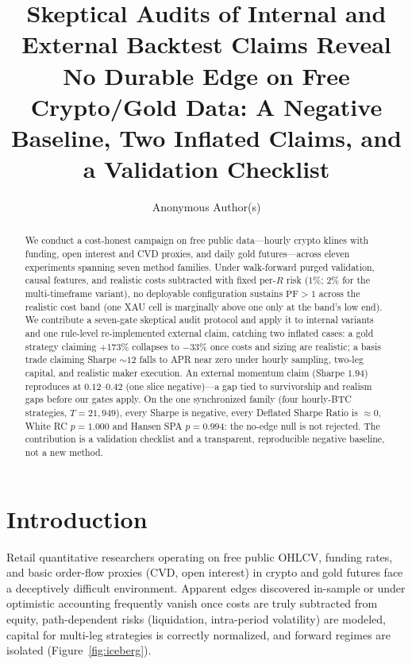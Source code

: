 \documentclass[sigconf,anonymous]{acmart}
\begin{document}
\title{Skeptical Audits of Internal and External Backtest Claims Reveal No Durable Edge on Free Crypto/Gold Data: A Negative Baseline, Two Inflated Claims, and a Validation Checklist}

\author{Anonymous Author(s)}

\begin{abstract}
We conduct a cost-honest campaign on free public data—hourly crypto klines with funding, open interest and CVD proxies, and daily gold futures—across eleven experiments spanning seven method families. Under walk-forward purged validation, causal features, and realistic costs subtracted with fixed per-$R$ risk ($1\%$; $2\%$ for the multi-timeframe variant), no deployable configuration sustains $\mathrm{PF}{>}1$ across the realistic cost band (one XAU cell is marginally above one only at the band's low end). We contribute a seven-gate skeptical audit protocol and apply it to internal variants and one rule-level re-implemented external claim, catching two inflated cases: a gold strategy claiming $+173\%$ collapses to $-33\%$ once costs and sizing are realistic; a basis trade claiming Sharpe ${\sim}12$ falls to APR near zero under hourly sampling, two-leg capital, and realistic maker execution. An external momentum claim (Sharpe $1.94$) reproduces at $0.12$–$0.42$ (one slice negative)—a gap tied to survivorship and realism gaps before our gates apply. On the one synchronized family (four hourly-BTC strategies, $T{=}21{,}949$), every Sharpe is negative, every Deflated Sharpe Ratio is ${\approx}0$, White RC $p{=}1.000$ and Hansen SPA $p{=}0.994$: the no-edge null is not rejected. The contribution is a validation checklist and a transparent, reproducible negative baseline, not a new method.
\end{abstract}


\maketitle

\section{Introduction}
Retail quantitative researchers operating on free public OHLCV, funding rates, and basic order-flow proxies (CVD, open interest) in crypto and gold futures face a deceptively difficult environment. Apparent edges discovered in-sample or under optimistic accounting frequently vanish once costs are truly subtracted from equity, path-dependent risks (liquidation, intra-period volatility) are modeled, capital for multi-leg strategies is correctly normalized, and forward regimes are isolated (Figure~\ref{fig:iceberg}).
\end{document}
